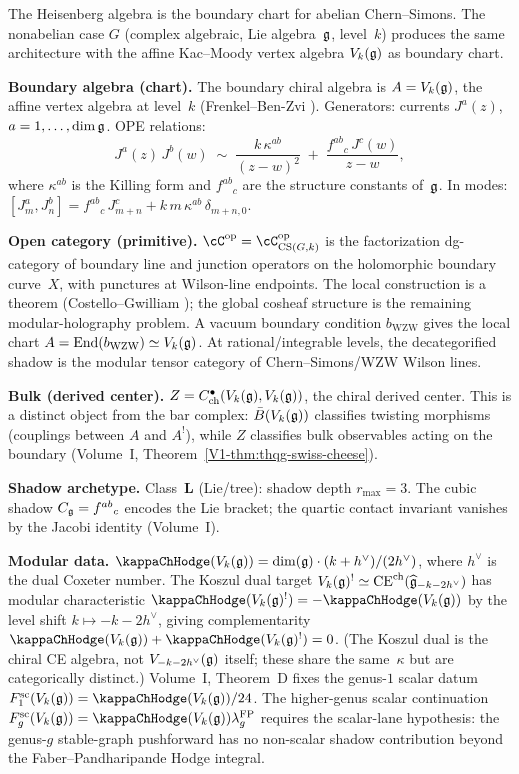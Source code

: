 The Heisenberg algebra is the boundary chart for abelian
Chern--Simons. The nonabelian case $G$ (complex algebraic,
Lie algebra~$\mathfrak{g}$, level~$k$) produces the same architecture
with the affine Kac--Moody vertex algebra $V_k(\mathfrak{g})$ as boundary
chart.

\noindent\textbf{Boundary algebra (chart).}
The boundary chiral algebra is $A = V_k(\mathfrak{g})$, the affine
vertex algebra at level~$k$
(Frenkel--Ben-Zvi \cite{FBZ04}).
Generators: currents $J^a(z)$, $a = 1, \ldots, \dim \mathfrak{g}$.
OPE relations:
\begin{equation}\label{eq:cs-km-ope}
J^a(z)\, J^b(w)
\;\sim\;
\frac{k\,\kappa^{ab}}{(z-w)^2}
\;+\;
\frac{f^{ab}{}_c\, J^c(w)}{z-w},
\end{equation}
where $\kappa^{ab}$ is the Killing form and $f^{ab}{}_c$
are the structure constants of~$\mathfrak{g}$. In modes:
$[J^a_m, J^b_n] = f^{ab}{}_c\, J^c_{m+n}
+ k\, m\, \kappa^{ab}\, \delta_{m+n,0}$.

\noindent\textbf{Open category (primitive).}
$\cC^{\mathrm{op}} = \cC_{\mathrm{CS}(G,k)}^{\mathrm{op}}$
is the factorization dg-category of boundary
line and junction operators on the holomorphic boundary
curve~$X$, with punctures at Wilson-line endpoints.
The local construction is a theorem
(Costello--Gwilliam \cite{CG17}); the global cosheaf
structure is the remaining modular-holography problem.
A vacuum boundary condition $b_{\mathrm{WZW}}$ gives the
local chart
$A = \mathrm{End}(b_{\mathrm{WZW}}) \simeq V_k(\mathfrak{g})$.
At rational/integrable levels, the decategorified shadow
is the modular tensor category of
Chern--Simons/WZW Wilson lines.

\noindent\textbf{Bulk (derived center).}
$Z = C^\bullet_{\mathrm{ch}}(V_k(\mathfrak{g}), V_k(\mathfrak{g}))$,
the chiral derived center.
This is a distinct object from the bar complex:
$\bar{B}(V_k(\mathfrak{g}))$ classifies twisting morphisms
(couplings between $A$ and $A^!$),
while $Z$ classifies bulk observables acting on
the boundary
(Volume~I, Theorem~\ref*{V1-thm:thqg-swiss-cheese}).

\noindent\textbf{Shadow archetype.}
Class~$\mathbf{L}$ (Lie/tree): shadow depth
$r_{\max} = 3$. The cubic shadow
$C_{\mathfrak{g}} = f^{ab}{}_c$ encodes the Lie bracket;
the quartic contact invariant vanishes
by the Jacobi identity
(Volume~I).

\noindent\textbf{Modular data.}
$\kappaChHodge(V_k(\fg)) = \dim(\fg) \cdot (k + h^\vee)/(2h^\vee)$,
where $h^\vee$ is the dual Coxeter number.
The Koszul dual target
$V_k(\mathfrak{g})^! \simeq \mathrm{CE}^{\mathrm{ch}}(\widehat{\mathfrak{g}}_{-k-2h^\vee})$
has modular characteristic
$\kappaChHodge(V_k(\fg)^!) = -\kappaChHodge(V_k(\fg))$
by the level shift $k \mapsto -k - 2h^\vee$,
giving complementarity
$\kappaChHodge(V_k(\fg)) + \kappaChHodge(V_k(\fg)^!) = 0$.
(The Koszul dual is the chiral CE algebra, not
$V_{-k-2h^\vee}(\mathfrak{g})$ itself; these share the
same~$\kappa$ but are categorically distinct.)
Volume~I, Theorem~D fixes the genus-$1$ scalar datum
$F_1^{\mathrm{sc}}(V_k(\fg))=\kappaChHodge(V_k(\fg))/24$.
The higher-genus scalar continuation
$F_g^{\mathrm{sc}}(V_k(\fg))
=\kappaChHodge(V_k(\fg))\lambda_g^{\mathrm{FP}}$
requires the scalar-lane hypothesis: the genus-$g$ stable-graph
pushforward has no non-scalar shadow contribution beyond the
Faber--Pandharipande Hodge integral.

